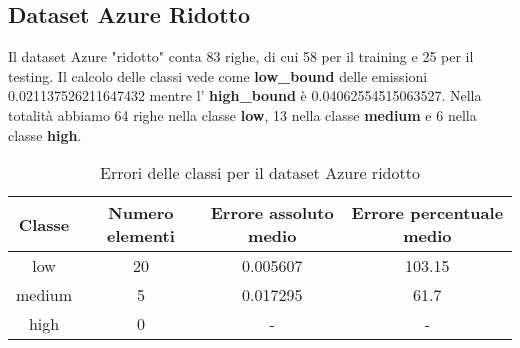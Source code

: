 \subsection{Dataset Azure Ridotto}

Il dataset Azure "ridotto" conta 83 righe, di cui 58 per il training e 25 per il testing.
Il calcolo delle classi vede come \textbf{low\_bound} delle emissioni 0.021137526211647432 mentre l' \textbf{high\_bound} è 0.04062554515063527.
Nella totalità abbiamo 64 righe nella classe \textbf{low}, 13 nella classe \textbf{medium} e 6 nella classe \textbf{high}.


\begin{table}[H]
    \centering
    \begin{tabular}{|c|c|c|c|}
        \hline
        \textbf{Classe} &  \textbf{Numero elementi} & \textbf{Errore assoluto medio} & \textbf{Errore percentuale medio} \\ \hline
        low             & 20                & 0.005607                   & 103.15            \\ \hline
        medium          & 5                & 0.017295                  & 61.7            \\ \hline
        high            & 0                & -                   & -            \\ \hline
    \end{tabular}
    \caption{Errori delle classi per il dataset Azure ridotto}
\end{table}








